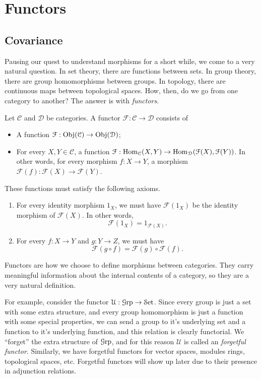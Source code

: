 \section{Functors}

\subsection{Covariance}

Pausing our quest to understand morphisms for a short while, we come to a very natural question. In set theory, there are functions between sets. In group theory, there are group homomorphisms between groups. In topology, there are continuous maps between topological spaces. How, then, do we go from one category to another? The answer is with \emph{functors}.

\begin{definition}[Functor]\label{dfn:2}
	Let $\mathcal{C} $ and $\mathcal{D} $ be categories. A functor $\mathcal{F} : \mathcal{C}  \to \mathcal{D} $ consists of
	\begin{itemize}
		\item A function $\mathcal{F} : \operatorname{Obj}(\mathcal{C} ) \to  \operatorname{Obj}(\mathcal{D} ) $;
		\item For every $X,Y\in \mathcal{C} $, a function $\mathcal{F} : \operatorname{Hom}_{\mathcal{C} }(X, Y)  \to \operatorname{Hom}_{\mathcal{D} }(\mathcal{F} (X), \mathcal{F} (Y)) $. In other words, for every morphism $f : X \to Y$, a morphism $\mathcal{F} (f): \mathcal{F} (X) \to \mathcal{F} (Y)$.
	\end{itemize}
	These functions must satisfy the following axioms.
	\begin{enumerate}
		\item For every identity morphism $1_X$, we must have $\mathcal{F} (1_X)$ be the identity morphism of $\mathcal{F} (X)$. In other words,
			\[
				\mathcal{F} (1_X)=1_{\mathcal{F} (X)} 
			.\]
		\item For every $f : X \to Y$ and $g : Y \to Z$, we must have
			\[
				\mathcal{F} (g\circ f)=\mathcal{F} (g)\circ \mathcal{F} (f)
			.\]
	\end{enumerate}
\end{definition}

Functors are how we choose to define morphisms between categories. They carry meaningful information about the internal contents of a category, so they are a very natural definition.

For example, consider the functor $\mathcal{U} : \mathcal{G}\mathrm{rp}  \to \mathcal{S}\mathrm{et} $. Since every group is just a set with some extra structure, and every group homomorphism is just a function with some special properties, we can send a group to it's underlying set and a function to it's underlying function, and this relation is clearly functorial. We ``forget'' the extra structure of $\mathcal{G}\mathrm{rp} $, and for this reason $\mathcal{U} $ is called an \emph{forgetful functor}. Similarly, we have forgetful functors for vector spaces, modules rings, topological spaces, etc. Forgetful functors will show up later due to their presence in adjunction relations.

